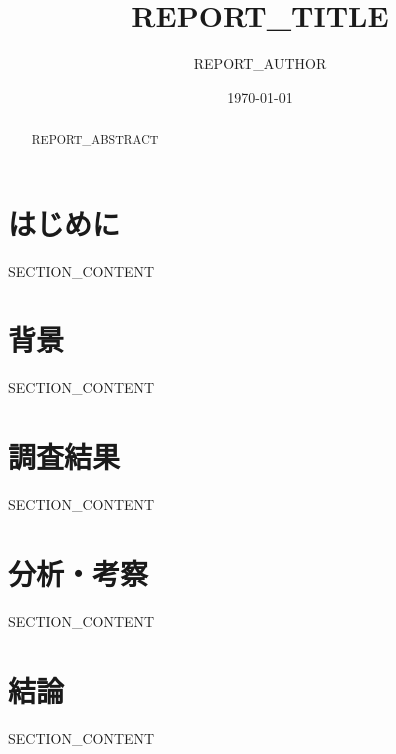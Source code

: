 \documentclass[a4paper,11pt]{ltjsarticle}
\title{REPORT\_TITLE}
\author{REPORT\_AUTHOR}
\date{\today}
\begin{document}
\maketitle
\thispagestyle{empty}

\begin{abstract}
REPORT\_ABSTRACT
\end{abstract}

\newpage
\tableofcontents
\newpage


\section{はじめに}
SECTION\_CONTENT

\section{背景}
SECTION\_CONTENT

\section{調査結果}
SECTION\_CONTENT

\section{分析・考察}
SECTION\_CONTENT

\section{結論}
SECTION\_CONTENT

\end{document}
